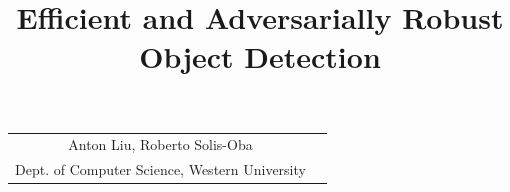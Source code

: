 \documentclass[10pt]{cai}
\begin{document}
\def\conferenceyear{2025}
\begin{center}

\title{Efficient and Adversarially Robust Object Detection}
\maketitle

\thispagestyle{empty}

\begin{tabular}{cc}
    Anton Liu\upstairs{\affilone,*}, Roberto Solis-Oba\upstairs{\affilone}
\\[0.25ex]
{\small \upstairs{\affilone} Dept. of Computer Science, Western University} \\
\end{tabular}
  
\vspace*{0.2in}
\end{center}
\end{document}
